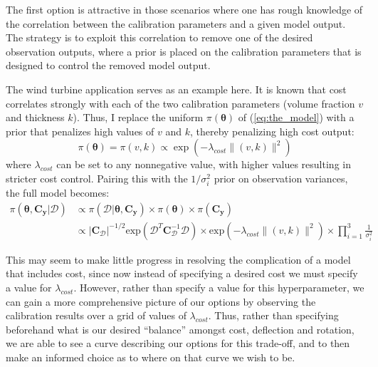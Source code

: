 \documentclass{article}
\begin{document}

The first option is attractive in those scenarios where one has rough knowledge of the correlation between the calibration parameters and a given model output. The strategy is to exploit this correlation to remove one of the desired observation outputs, where a prior is placed on the calibration parameters that is designed to control the removed model output.

The wind turbine application serves as an example here. It is known that cost correlates strongly with each of the two calibration parameters (volume fraction $v$ and thickness $k$). Thus, I replace the uniform $\pi(\boldsymbol \theta)$ of (\ref{eq:the_model}) with a prior that penalizes high values of $v$ and $k$, thereby penalizing high cost output:
\begin{equation}\label{eq:theta_prior}
\pi(\boldsymbol \theta)=\pi(v,k)\propto \exp(-\lambda_{cost}\lVert (v,k)\rVert ^2)
\end{equation}
where $\lambda_{cost}$ can be set to any nonnegative value, with higher values resulting in stricter cost control. Pairing this with the $1/\sigma^2_i$ prior on observation variances, the full model becomes:
\begin{equation}\label{full_model_3}
\begin{aligned}
\pi(\boldsymbol\theta,\mathbf C_{\mathbf y}|\mathcal D ) &\propto
\pi(\mathcal D|\boldsymbol\theta,\mathbf C_{\mathbf y}) \times \pi(\boldsymbol\theta) \times \pi(\mathbf C_{\mathbf y})\\
&\propto \lvert \mathbf C_{\mathcal D} \rvert ^{-1/2} \mathrm{exp}(\mathcal D^T \mathbf C_{\mathcal D}^{-1} \mathcal D) \times \mathrm{exp}(-\lambda_{cost}\lVert(v,k)\rVert^2)\times\prod_{i=1}^3 \frac1{\sigma^2_i}
\end{aligned}
\end{equation}

This may seem to make little progress in resolving the complication of a model that includes cost, since now instead of specifying a desired cost we must specify a value for $\lambda_{cost}$. However, rather than specify a value for this hyperparameter, we can gain a more comprehensive picture of our options by observing the calibration results over a grid of values of $\lambda_{cost}$. Thus, rather than specifying beforehand what is our desired ``balance'' amongst cost, deflection and rotation, we are able to see a curve describing our options for this trade-off, and to then make an informed choice as to where on that curve we wish to be. 
\end{document}
